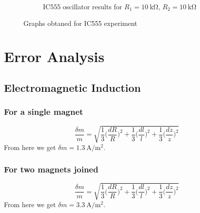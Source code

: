 \documentclass[%
 aip,
 amsmath,amssymb,
 reprint, floatfix%
]{revtex4-1}
\begin{document}
\begin{figure}
\begin{subfigure}[b]{0.5\textwidth}
            \caption{IC555 oscillator results for $R_1 = \SI{10}{\kilo \ohm}$, $R_2 = \SI{10}{\kilo \ohm}$}
            \label{fig:90gate}
        \end{subfigure}
            \caption{Graphs obtaned for IC555 experiment}
            \label{fig:90}
    \end{figure}
\section{Error Analysis}
\subsection{Electromagnetic Induction}
\subsubsection{For a single magnet}
    \begin{equation}
        \dfrac{\delta m}{m} = \sqrt{\dfrac{1}{3}\Big(\dfrac{dR}{R}\Big)^2+\dfrac{1}{3}\Big(\dfrac{dl}{l}\Big)^2+\dfrac{1}{3}\Big(\dfrac{dz}{z}\Big)^2}
    \end{equation}
    From here we get $\delta m = \SI{1.3}{\ampere \per \metre \squared}$.
    \subsubsection{For two magnets joined}
    \begin{equation}
        \dfrac{\delta m}{m} = \sqrt{\dfrac{1}{3}\Big(\dfrac{dR}{R}\Big)^2+\dfrac{1}{3}\Big(\dfrac{dl}{l}\Big)^2+\dfrac{1}{3}\Big(\dfrac{dz}{z}\Big)^2}
    \end{equation}
    From here we get $\delta m = \SI{3.3}{\ampere \per \metre \squared}$.
    
\end{document}
